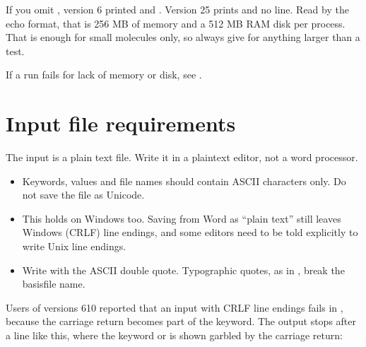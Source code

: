 \documentclass[letterpaper,10pt,english,openany,oneside]{sphinxmanual}
\begin{document}
\sphinxAtStartPar
If you omit , version 6 printed  and . Version 25 prints
 and no  line. Read by the echo format, that is 256 MB of memory and a
512 MB RAM disk per process.
That is enough for small molecules only, so always give  for anything larger than a test.



\sphinxAtStartPar
If a run fails for lack of memory or disk, see {\hyperref[\detokenize{troubleshooting/common-problems:troubleshooting-memory}]{}}.


\section{Input file requirements}
\label{\detokenize{start/running:input-file-requirements}}\label{\detokenize{start/running:running-input-files}}
\sphinxAtStartPar
The input is a plain text file. Write it in a plain\sphinxhyphen{}text editor, not a word processor.
\begin{itemize}
\item {} 
\sphinxAtStartPar
{} Keywords, values and file names should contain ASCII characters only. Do not save the file as
Unicode.



\item {} 
\sphinxAtStartPar
{} This holds on Windows too. Saving from Word as “plain text” still leaves Windows (CRLF)
line endings, and some editors need to be told explicitly to write Unix line endings.



\item {} 
\sphinxAtStartPar
{} Write  with the ASCII double quote. Typographic quotes, as in ,
break the basis\sphinxhyphen{}file name.



\end{itemize}

\sphinxAtStartPar
Users of versions 6\textendash{}10 reported that an input with CRLF line endings fails in , because the carriage
return becomes part of the keyword. The output stops after a line like this, where the keyword  or  is shown garbled by the carriage
return:
\end{document}
